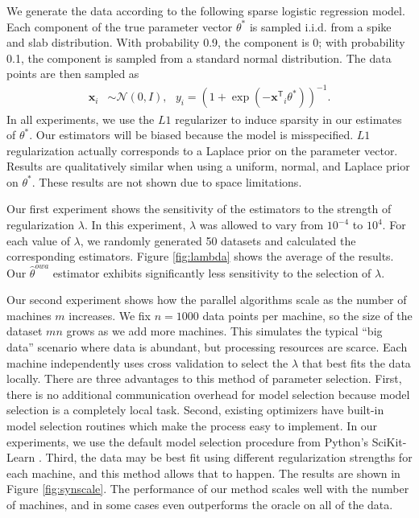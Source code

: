 \documentclass[twoside]{article}
\newcommand{\x}{\mathbf{x}}
\newcommand{\w}{\theta}
\newcommand{\wowa}{\hat\w^{owa}}
\newcommand{\wstar}{{\w^{*}}}
\newcommand{\normal}[2]{\ensuremath{\mathcal{N}\left({{#1}},{{#2}}\right)}}
\newcommand{\trans}[1]{\ensuremath{{#1}^{\mathsf{T}}}}
\begin{document}
We generate the data according to the following sparse logistic regression model.
Each component of the true parameter vector $\wstar$ is sampled i.i.d. from a spike and slab distribution.
With probability 0.9, the component is 0;
with probability 0.1, the component is sampled from a standard normal distribution.
The data points are then sampled as
\begin{equation}
\begin{aligned}
\x_i &\sim \normal{0}{I}
,
~~~
y_i = \left(1+\exp(-\trans\x_i\wstar)\right)^{-1}
.
\end{aligned}
\end{equation}
In all experiments, we use the $L1$ regularizer to induce sparsity in our estimates of $\wstar$.
Our estimators will be biased because the model is misspecified.
$L1$ regularization actually corresponds to a Laplace prior on the parameter vector.
Results are qualitatively similar when using a uniform, normal, and Laplace prior on $\wstar$.
These results are not shown due to space limitations.

Our first experiment shows the sensitivity of the estimators to the strength of regularization $\lambda$.
In this experiment, $\lambda$ was allowed to vary from $10^{-4}$ to $10^4$.
For each value of $\lambda$, we randomly generated 50 datasets and calculated the corresponding estimators.
Figure \ref{fig:lambda} shows the average of the results.
Our $\wowa$ estimator exhibits significantly less sensitivity to the selection of $\lambda$.

Our second experiment shows how the parallel algorithms scale as the number of machines $m$ increases.
We fix $n=1000$ data points per machine, so the size of the dataset $mn$ grows as we add more machines.
This simulates the typical ``big data'' scenario where data is abundant,
but processing resources are scarce.
Each machine independently uses cross validation to select the $\lambda$ that best fits the data locally.
There are three advantages to this method of parameter selection.
First, there is no additional communication overhead for model selection because model selection is a completely local task.
Second, existing optimizers have built-in model selection routines which make the process easy to implement.
In our experiments, we use the default model selection procedure from Python's SciKit-Learn \citep{scikit-learn}.
Third, the data may be best fit using different regularization strengths for each machine,
and this method allows that to happen.
The results are shown in Figure \ref{fig:synscale}.
The performance of our method scales well with the number of machines,
and in some cases even outperforms the oracle on all of the data.
\end{document}
